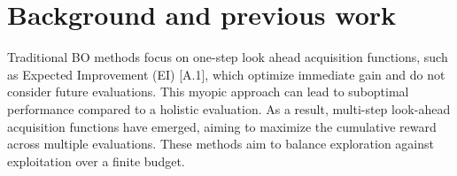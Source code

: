 \documentclass{article}
\newcommand{\bfx}{\textbf{x}}
\begin{document}




\section{Background and previous work}
Traditional BO methods focus on one-step look ahead acquisition 
functions, such as Expected Improvement (EI) [A.1], which optimize 
immediate gain and do not consider future evaluations. This myopic 
approach can lead to suboptimal performance compared to a holistic 
evaluation. As a result, multi-step look-ahead acquisition functions have emerged, 
aiming to maximize the cumulative reward across multiple 
evaluations. These methods aim to balance exploration against exploitation over a finite budget. 
\end{document}
